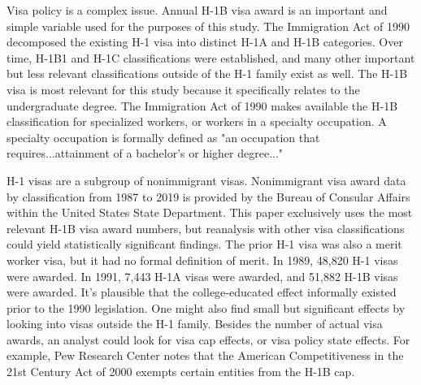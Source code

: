 \documentclass[review]{elsarticle}
\begin{document}
    Visa policy is a complex issue.
    Annual H-1B visa award is an important and simple variable used for the purposes of this study.
    The Immigration Act of 1990 decomposed the existing H-1 visa into distinct H-1A and H-1B categories.
    Over time, H-1B1 and H-1C classifications were established,
    and many other important but less relevant classifications outside of the H-1 family exist as well.
    The H-1B visa is most relevant for this study because it specifically relates to the undergraduate degree.
    The Immigration Act of 1990 makes available the H-1B classification for specialized workers,
    or workers in a specialty occupation.
    A specialty occupation is formally defined as "an occupation that requires...attainment of a bachelor's or higher degree..."

    H-1 visas are a subgroup of nonimmigrant visas.
    Nonimmigrant visa award data by classification from 1987 to 2019 is provided by
    the Bureau of Consular Affairs within the United States State Department\cite{bureauof_2020}.
    This paper exclusively uses the most relevant H-1B visa award numbers,
    but reanalysis with other visa classifications could yield statistically significant findings.
    The prior H-1 visa was also a merit worker visa, but it had no formal definition of merit.
    In 1989, 48,820 H-1 visas were awarded.
    In 1991, 7,443 H-1A visas were awarded, and 51,882 H-1B visas were awarded.
    It's plausible that the college-educated effect informally existed prior to the 1990 legislation.
    One might also find small but significant effects by looking into visas outside the H-1 family.
    Besides the number of actual visa awards, an analyst could look for visa cap effects,
    or visa policy state effects.
    For example, Pew Research Center notes that the American Competitiveness in the 21st Century Act of 2000 exempts certain entities from the H-1B cap\cite{ruiz2017key}.
\end{document}
